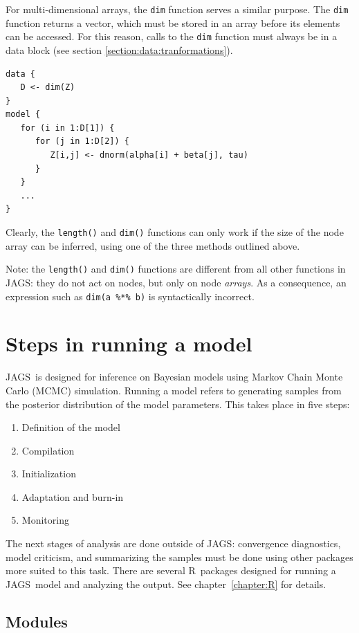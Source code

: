 \documentclass[11pt, a4paper, titlepage]{report}
\newcommand{\JAGS}{\textsf{JAGS}}
\newcommand{\R}{\textsf{R}}
\begin{document}
For multi-dimensional arrays, the \verb+dim+ function serves a similar
purpose. The \verb+dim+ function returns a vector, which must be stored
in an array before its elements can be accessed. For this reason, calls
to the \verb+dim+ function must always be in a data block (see section
\ref{section:data:tranformations}).
\begin{verbatim}
data {
   D <- dim(Z)
}
model {
   for (i in 1:D[1]) {
      for (j in 1:D[2]) {
         Z[i,j] <- dnorm(alpha[i] + beta[j], tau)
      }
   }
   ...
}
\end{verbatim}
Clearly, the \verb+length()+ and \verb+dim()+ functions can only
work if the size of the node array can be inferred, using one of the
three methods outlined above.

Note: the \verb+length()+ and \verb+dim()+ functions are different
from all other functions in \JAGS: they do not act on nodes, but only
on node {\em arrays}. As a consequence, an expression such as
\verb+dim(a %*% b)+ is syntactically incorrect.

\chapter{Steps in running a model}
\label{chapter:running}

\JAGS\ is designed for inference on Bayesian models using Markov Chain
Monte Carlo (MCMC) simulation.  Running a model refers to generating
samples from the posterior distribution of the model parameters.  This
takes place in five steps:
\begin{enumerate}
\item Definition of the model
\item Compilation
\item Initialization
\item Adaptation and burn-in
\item Monitoring
\end{enumerate}
The next stages of analysis are done outside of \JAGS: convergence
diagnostics, model criticism, and summarizing the samples must be done
using other packages more suited to this task. There are several
\R\ packages designed for running a \JAGS\ model and analyzing the
output. See chapter~\ref{chapter:R} for details.

\section{Modules}
\label{section:running:modules}
\end{document}

